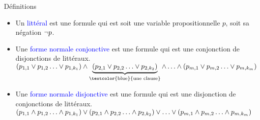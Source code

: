 \documentclass[10pt]{beamer}
\begin{document}
\begin{frame}{\Ctitle}{\stitle}
    \begin{block}{Définitions}
        \begin{itemize}
        \item Un \textcolor{blue}{littéral} est une formule qui est soit une variable propositionnelle $p$, soit sa négation $\neg p$.
        \item<2-> Une \textcolor{blue}{forme normale conjonctive} est une formule qui est une conjonction de disjonctions de littéraux.\\
        $(p_{1,1} \ou p_{1,2} \dots \ou p_{1,k_1}) \et \underbrace{(p_{2,1} \ou p_{2,2} \dots \ou p_{2,k_2})}_{\text{\textcolor{blue}{une clause}}} \et \dots \et (p_{m,1} \ou p_{m,2} \dots \ou p_{m,k_m})$
        \item<3-> Une \textcolor{blue}{forme normale disjonctive} est une formule qui est une disjonction de conjonctions de littéraux.\\
        $(p_{1,1} \et p_{1,2} \dots \et p_{1,k_1}) \ou (p_{2,1} \et p_{2,2} \dots \et p_{2,k_2}) \ou \dots \ou (p_{m,1} \et p_{m,2} \dots \et p_{m,k_m})$
        \end{itemize}
    \end{block}
\end{frame}
\end{document}
